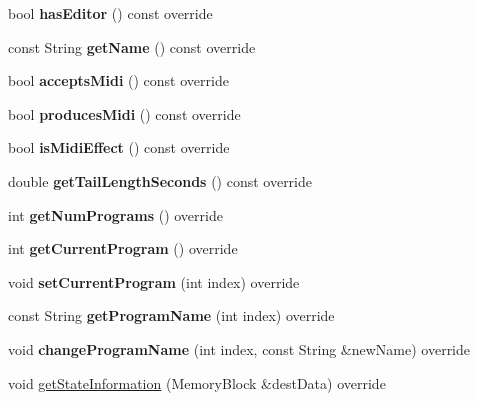 \begin{DoxyCompactItemize}
bool {\bfseries has\+Editor} () const override
\item 
\mbox{\label{class_plume_processor_ae94a4572fc37682092a145a62606b0bb}} 
const String {\bfseries get\+Name} () const override
\item 
\mbox{\label{class_plume_processor_a9dfd593b13b864f6d646600453b983bc}} 
bool {\bfseries accepts\+Midi} () const override
\item 
\mbox{\label{class_plume_processor_af53ebafbc9dbb53b5f417f06814e5753}} 
bool {\bfseries produces\+Midi} () const override
\item 
\mbox{\label{class_plume_processor_a92025e451d25175363b38f5fa1f99e8a}} 
bool {\bfseries is\+Midi\+Effect} () const override
\item 
\mbox{\label{class_plume_processor_ae85b56bdc30fc398bdc3e6a9b40c733a}} 
double {\bfseries get\+Tail\+Length\+Seconds} () const override
\item 
\mbox{\label{class_plume_processor_acc125f472abf81a2273f7aafe75302ec}} 
int {\bfseries get\+Num\+Programs} () override
\item 
\mbox{\label{class_plume_processor_a5bf89a890c12f02dd352a523c1a88f64}} 
int {\bfseries get\+Current\+Program} () override
\item 
\mbox{\label{class_plume_processor_a909a5331670eb7b2e722498e755bf890}} 
void {\bfseries set\+Current\+Program} (int index) override
\item 
\mbox{\label{class_plume_processor_ac16c6d0751467defa92a523ffb6af939}} 
const String {\bfseries get\+Program\+Name} (int index) override
\item 
\mbox{\label{class_plume_processor_a28ce5f77d4e4871ff57ade3e730b5cd9}} 
void {\bfseries change\+Program\+Name} (int index, const String \&new\+Name) override
\item 
void \mbox{\hyperlink{class_plume_processor_ae06dd312c3dc3ba7389ce44fd74cbc18}{get\+State\+Information}} (Memory\+Block \&dest\+Data) override

\end{DoxyCompactItemize}

